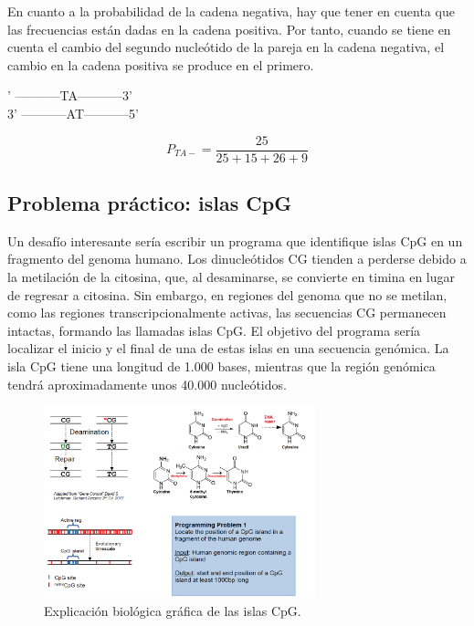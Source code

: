 En cuanto a la probabilidad de la cadena negativa, hay que tener en cuenta que las frecuencias están dadas en la cadena positiva. Por tanto, cuando se tiene en cuenta el cambio del segundo nucleótido de la pareja en la cadena negativa, el cambio en la cadena positiva se produce en el primero. \\

\begin{table}[htbp]
' -----------TA-----------3' \\
3' -----------AT-----------5' \\
\end{table}

$$P_{TA-} = \frac{25}{25 + 15 + 26 + 9}$$

\subsection{Problema práctico: islas CpG}
Un desafío interesante sería escribir un programa que identifique islas CpG en un fragmento del genoma humano. Los dinucleótidos CG tienden a perderse debido a la metilación de la citosina, que, al desaminarse, se convierte en timina en lugar de regresar a citosina. Sin embargo, en regiones del genoma que no se metilan, como las regiones transcripcionalmente activas, las secuencias CG permanecen intactas, formando las llamadas islas CpG. El objetivo del programa sería localizar el inicio y el final de una de estas islas en una secuencia genómica. La isla CpG tiene una longitud de 1.000 bases, mientras que la región genómica tendrá aproximadamente unos 40.000 nucleótidos.

\begin{figure}[htbp]
\centering
\includegraphics[width = 0.7\textwidth]{figs/cpg-islands.png}
\caption{Explicación biológica gráfica de las islas CpG. }
\end{figure}

